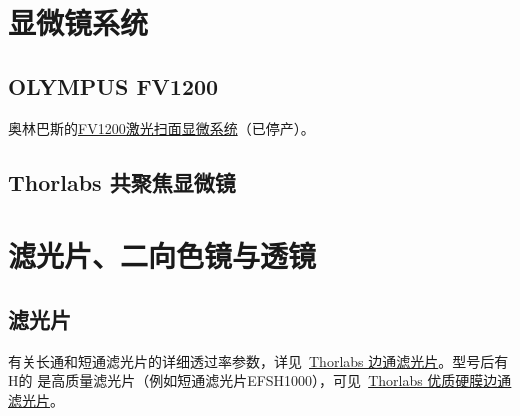 \documentclass[cn,11pt,chinese]{elegantbook}
\begin{document}
\section{显微镜系统}
\subsection{OLYMPUS FV1200}
奥林巴斯的\href{https://www.olympus-lifescience.com.cn/zh/laser-scanning/fv1200}{FV1200激光扫面显微系统}（已停产）。

\subsection{Thorlabs 共聚焦显微镜}

\section{滤光片、二向色镜与透镜}
\subsection{滤光片}
有关长通和短通滤光片的详细透过率参数，详见~\href{https://www.thorlabschina.cn/newgrouppage9.cfm?objectgroup_id=918}{Thorlabs 边通滤光片}。型号后有H的
是高质量滤光片（例如短通滤光片EFSH1000），可见~\href{https://www.thorlabschina.cn/newgrouppage9.cfm?objectgroup_id=6082}{Thorlabs 优质硬膜边通滤光片}。
\end{document}

